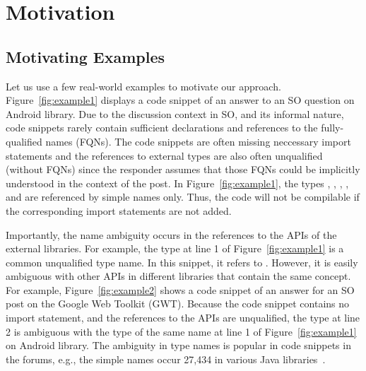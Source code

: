 \section{Motivation}
\label{motiv:sec}

\subsection{Motivating Examples}
\label{examples:sec}



Let us use a few real-world examples to motivate our approach.
Figure~\ref{fig:example1} displays a code snippet of an answer to an
SO question on Android library. Due to the discussion context in SO,
and its informal nature, code snippets rarely contain sufficient
declarations and references to the fully-qualified names (FQNs). The
code snippets are often missing neccessary import statements and the
references to external types are also often unqualified (without FQNs)
since the responder assumes that those FQNs could be implicitly
understood in the context of the post. In Figure~\ref{fig:example1},
the types , , , ,
and  are referenced by simple names only. Thus, the code
will not be compilable if the corresponding import statements are not
added.



Importantly, the name ambiguity occurs in the references to the APIs
of the external libraries. For example, the type  at line
1 of Figure~\ref{fig:example1} is a common unqualified type name. In
this snippet, it refers to . However, it
is easily ambiguous with other APIs in different libraries that
contain the same concept. For example, Figure~\ref{fig:example2} shows
a code snippet of an answer for an SO post on the Google Web Toolkit
(GWT). Because the code snippet contains no import statement, and the
references to the APIs are unqualified, the type  at line
2 is ambiguous with the type of the same name at line 1 of
Figure~\ref{fig:example1} on Android library. The ambiguity in type
names is popular in code snippets in the forums, e.g., the
simple names  occur 27,434 in various Java
libraries~\cite{liveapi14}.







